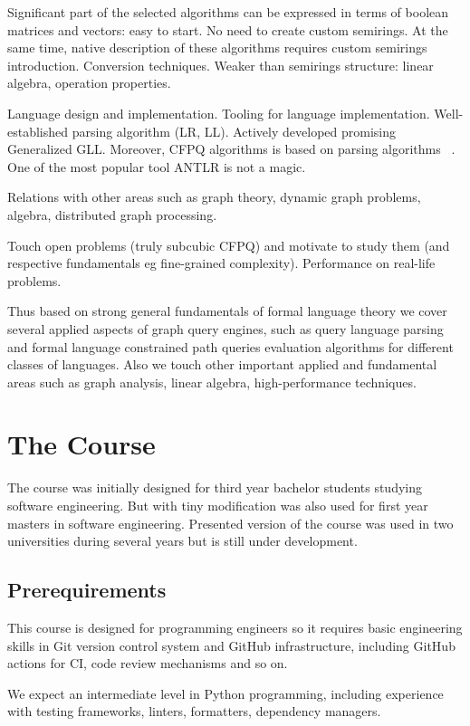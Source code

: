 \documentclass[sigconf]{acmart}
\begin{document}
Significant part of the selected algorithms can be expressed in terms of boolean matrices and vectors: easy to start.
No need to create custom semirings.
At the same time, native description of these algorithms requires custom semirings introduction.
Conversion techniques.
Weaker than semirings structure: linear algebra, operation properties. 

Language design and implementation. 
Tooling for language implementation.
Well-established parsing algorithm (LR, LL).
Actively developed promising Generalized GLL. 
Moreover, CFPQ algorithms is based on parsing algorithms ~\cite{!!!,!!!,!!!}.
One of the most popular tool ANTLR is not a magic. 

Relations with other areas such as graph theory, dynamic graph problems, algebra, distributed graph processing.

Touch open problems (truly subcubic CFPQ) and motivate to study them (and respective fundamentals eg fine-grained complexity).
Performance on real-life problems.

Thus based on strong general fundamentals of formal language theory we cover several applied aspects of graph query engines, such as query language parsing and formal language constrained path queries evaluation algorithms for different classes of languages.
Also we touch other important applied and fundamental areas such as graph analysis, linear algebra, high-performance techniques.

\section{The Course}

The course was initially designed for third year bachelor students studying software engineering.
But with tiny modification was also used for first year masters in software engineering.
Presented version of the course was used in two universities during several years but is still under development.

\subsection{Prerequirements}

This course is designed for programming engineers so it requires basic engineering skills in Git version control system and GitHub infrastructure, including GitHub actions for CI, code review mechanisms and so on.

We expect an intermediate level in Python programming, including experience with testing frameworks, linters, formatters, dependency managers. 
\end{document}
